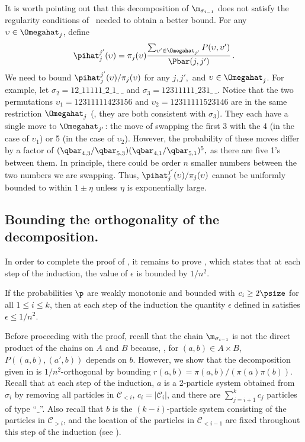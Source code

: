 \documentclass{toc}
\begin{document}
\begin{remark}\label{rem:eta}

It is worth pointing out that this decomposition of $\m_{\sigma_{i-1}}$ 
does not satisfy the 
regularity conditions of~\cite{jstv04} needed to obtain a better bound.  
For any $\upsilon\in \Omegahat_j$, define 
\[\pihat_j^{j'}(\upsilon)=\pi_j(\upsilon)\frac{\sum_{\upsilon'\in\Omegahat_{j'}}P(\upsilon,\upsilon')}{\Pbar(j,j')}\,.\] 
We need to bound $\pihat_j^{j'}(\upsilon)/\pi_j(\upsilon)$ for any 
$j,j',$ and $\upsilon\in\Omegahat_j$.   For example, let $\sigma_{2} = 
12\_11111\_2\_1\_~\_$ and $\sigma_3 = 12311111\_231\_~\_$. Notice that 
the two permutations $\upsilon_1=12311111423156$ and 
$\upsilon_2=12311111523146$ are in the same restriction $\Omegahat_j$ 
(\ie,  they are both consistent with $\sigma_3$).  They each have a 
single move to $\Omegahat_{j'}$: the move of swapping the first 3 with 
the 4 (in the case of $\upsilon_1$) or 5 (in the case of $\upsilon_2$).  
However, the probability of these moves differ by a factor of 
$(\qbar_{4,3}/\qbar_{5,3})(\qbar_{4,1}/\qbar_{5,1})^5,$ as there are five 1's between 
them.  In principle, there could be order $n$ smaller numbers between 
the two numbers we are swapping.  Thus, 
$\pihat_j^{j'}(\upsilon)/\pi_j(\upsilon)$ cannot be uniformly bounded 
to within $1\pm \eta$ unless $\eta$ is exponentially large. 

\end{remark}

%
%
\subsection{Bounding the orthogonality of the decomposition.}\label{sec:ortho}  %

In order to complete the proof of , it remains to prove
, which states that %
%
at each step of the induction,
the value of $\epsilon$ is bounded by $1/n^2$. %

\begin{lemma}\label{lem:perms}
If the probabilities $\p$ are weakly monotonic and bounded with 
$c_i\geq 2\psize$ for all $1\leq i \leq k$, then at each step of 
the induction %
the quantity $\epsilon$ defined in  
satisfies $\epsilon\leq 1/n^2$. %
\end{lemma}

Before proceeding with the proof, 
recall that the chain $\m_{\sigma_{i-1}}$ is not the direct product of 
the chains on $A$ and $B$ because, \eg, for $(a,b) \in A\times B$, 
$P((a,b),(a',b))$ depends on $b$. However, we show that the 
decomposition given in  is $1/n^2$-orthogonal by 
bounding $r(a,b) = \pi(a,b)/(\pi(a)\pi(b))$.  Recall that at each step 
of the induction, $a$ is a 2-particle system obtained from $\sigma_i$ 
by removing all particles in $\mathcal{C}_{< i}$, $c_i = 
|\mathcal{C}_i|$, and there are $\sum^{k}_{j=i+1}c_j$ particles of type 
``$\_$''.  Also recall that $b$ is the $(k-i)$-particle system 
consisting of the particles in $\mathcal{C}_{>i}$, and the location of 
the particles in $\mathcal{C}_{< i-1}$ are fixed throughout this step 
of the induction (see ).  
\end{document}
